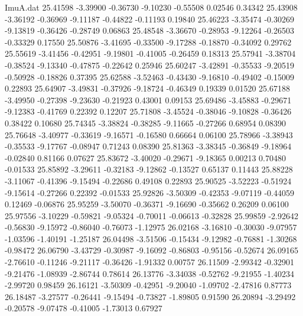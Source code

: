 \begin{filecontents}{ImuA.dat}
  25.41598   -3.39900   -0.36730   -9.10230   -0.55508    0.02546    0.34342
  25.43908   -3.36192   -0.36969   -9.11187   -0.44822   -0.11193    0.19840
  25.46223   -3.35474   -0.30269   -9.13819   -0.36426   -0.28749    0.06863
  25.48548   -3.36670   -0.28953   -9.12264   -0.26503   -0.33329    0.17550
  25.50876   -3.41695   -0.33500   -9.17288   -0.18870   -0.34092    0.29762
  25.55619   -3.41456   -0.42951   -9.19801   -0.41005   -0.26459    0.18313
  25.57941   -3.38704   -0.38524   -9.13340   -0.47875   -0.22642    0.25946
  25.60247   -3.42891   -0.35533   -9.20519   -0.50928   -0.18826    0.37395
  25.62588   -3.52463   -0.43430   -9.16810   -0.49402   -0.15009    0.22893
  25.64907   -3.49831   -0.37926   -9.18724   -0.46349    0.19339    0.01520
  25.67188   -3.49950   -0.27398   -9.23630   -0.21923    0.43001    0.09153
  25.69486   -3.45883   -0.29671   -9.12383   -0.41769    0.22392    0.12207
  25.71808   -3.45524   -0.38046   -9.10828   -0.36426    0.38422    0.10680
  25.74345   -3.38824   -0.38285   -9.11665   -0.27266    0.68954    0.08390
  25.76648   -3.40977   -0.33619   -9.16571   -0.16580    0.66664    0.06100
  25.78966   -3.38943   -0.35533   -9.17767   -0.08947    0.71243    0.08390
  25.81363   -3.38345   -0.36849   -9.18964   -0.02840    0.81166    0.07627
  25.83672   -3.40020   -0.29671   -9.18365    0.00213    0.70480   -0.01533
  25.85892   -3.29611   -0.32183   -9.12862   -0.13527    0.65137    0.11443
  25.88228   -3.11067   -0.41396   -9.15494   -0.22686    0.49108    0.22893
  25.90525   -3.52223   -0.51924   -9.15614   -0.27266    0.22392   -0.01533
  25.92826   -3.50309   -0.42353   -9.07119   -0.44059    0.12469   -0.06876
  25.95259   -3.50070   -0.36371   -9.16690   -0.35662    0.26209    0.06100
  25.97556   -3.10229   -0.59821   -9.05324   -0.70011   -0.06613   -0.32828
  25.99859   -2.92642   -0.56830   -9.15972   -0.86040   -0.76073   -1.12975
  26.02168   -3.16810   -0.30030   -9.07957   -1.03596   -1.40191   -1.25187
  26.04498   -3.51506   -0.15434   -9.12982   -0.76881   -1.30268   -0.98472
  26.06790   -3.43729   -0.30987   -9.16092   -0.86803   -0.95156   -0.52674
  26.09165   -2.76610   -0.11246   -9.21117   -0.36426   -1.91332    0.00757
  26.11509   -2.99342   -0.32901   -9.21476   -1.08939   -2.86744    0.78614
  26.13776   -3.34038   -0.52762   -9.21955   -1.40234   -2.99720    0.98459
  26.16121   -3.50309   -0.42951   -9.20040   -1.09702   -2.47816    0.87773
  26.18487   -3.27577   -0.26441   -9.15494   -0.73827   -1.89805    0.91590
  26.20894   -3.29492   -0.20578   -9.07478   -0.41005   -1.73013    0.67927

\end{filecontents}
